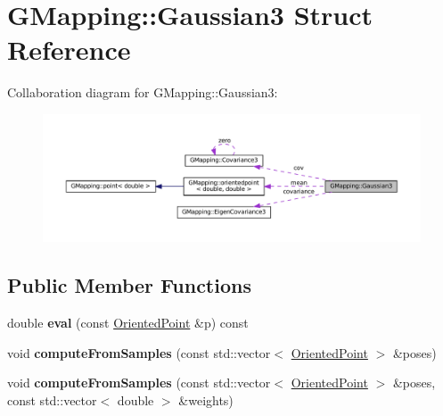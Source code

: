 \hypertarget{structGMapping_1_1Gaussian3}{}\section{G\+Mapping\+:\+:Gaussian3 Struct Reference}
\label{structGMapping_1_1Gaussian3}


Collaboration diagram for G\+Mapping\+:\+:Gaussian3\+:
\nopagebreak
\begin{figure}[H]
\begin{center}
\leavevmode
\includegraphics[width=350pt]{structGMapping_1_1Gaussian3__coll__graph}
\end{center}
\end{figure}
\subsection*{Public Member Functions}
\begin{DoxyCompactItemize}
\item 
\mbox{\label{structGMapping_1_1Gaussian3_a1769fe4ee91ac205d1dcd38ae49e5a89}} 
double {\bfseries eval} (const \hyperlink{structGMapping_1_1orientedpoint}{Oriented\+Point} \&p) const
\item 
\mbox{\label{structGMapping_1_1Gaussian3_ac92a49024d8605f61f252dc39798dc35}} 
void {\bfseries compute\+From\+Samples} (const std\+::vector$<$ \hyperlink{structGMapping_1_1orientedpoint}{Oriented\+Point} $>$ \&poses)
\item 
\mbox{\label{structGMapping_1_1Gaussian3_aa615992e9701c9aaa1391bf9c1422f32}} 
void {\bfseries compute\+From\+Samples} (const std\+::vector$<$ \hyperlink{structGMapping_1_1orientedpoint}{Oriented\+Point} $>$ \&poses, const std\+::vector$<$ double $>$ \&weights)
\end{DoxyCompactItemize}
